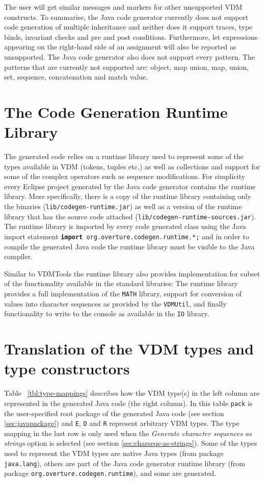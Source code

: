 The user will get similar messages and markers for other unsupported
VDM constructs. To summarise, the Java code generator currently does
not support code generation of multiple inheritance and neither does
it support traces, type binds, invariant checks and pre and post
conditions. Furthermore, let expressions appearing on the right-hand
side of an assignment will also be reported as unsupported. The Java
code generator also does not support every pattern. The patterns that
are currently not supported are: object, map union, map, union, set,
sequence, concatenation and match value.

\section{The Code Generation Runtime Library}

The generated code relies on a runtime library used to represent some
of the types available in VDM (tokens, tuples etc.) as well as
collections and support for some of the complex operators such as
sequence modifications. For simplicity every Eclipse project generated
by the Java code generator contains the runtime library. More
specifically, there is a copy of the runtime library containing only
the binaries (\texttt{lib/codegen-runtime.jar}) as well as a version
of the runtime library that has the source code attached
(\texttt{lib/codegen-runtime-sources.jar}). The runtime library is
imported by every code generated class using the Java import statement
\texttt{\textbf{import} org.overture.codegen.runtime.*;} and in order
to compile the generated Java code the runtime library must be visible
to the Java compiler.

Similar to VDMTools the runtime library also provides implementation
for subset of the functionality available in the standard libraries:
The runtime library provides a full implementation of the
\texttt{MATH} library, support for conversion of values into character
sequences as provided by the \texttt{VDMUtil}, and finally
functionality to write to the console as available in the \texttt{IO}
library.

\section{Translation of the VDM types and type constructors}
\label{sec:type-mappings}

Table ~\ref{tbl:type-mappings} describes how the VDM type(s) in the
left column are represented in the generated Java code (the right
column). In this table \texttt{pack} is the user-specified root
package of the generated Java code (see section \ref{sec:javapackage})
and \texttt{E}, \texttt{D} and \texttt{R} represent arbitrary VDM
types. The type mapping in the last row is only used when the
\emph{Generate character sequences as strings} option is selected (see
section \ref{sec:charseqs-as-strings}). Some of the types used to
represent the VDM types are native Java types (from package
\texttt{java.lang}), others are part of the Java code generator
runtime library (from package \texttt{org.overture.codegen.runtime}),
and some are generated.

